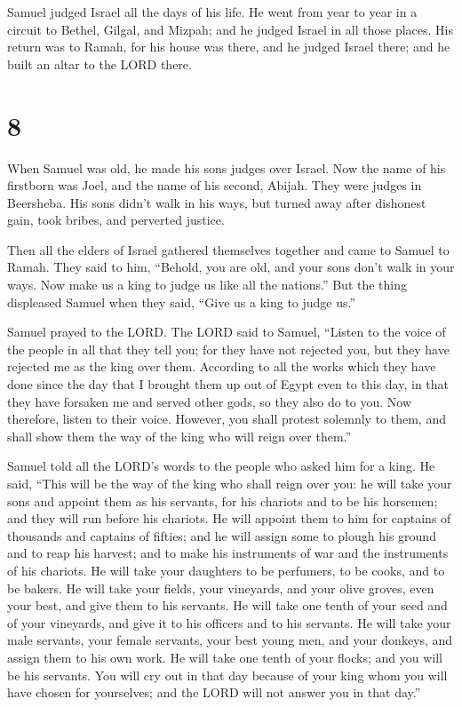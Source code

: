  Samuel judged Israel all the days of his life.
 He went from year to year in a circuit to Bethel,
Gilgal, and Mizpah; and he judged Israel in all those places.
 His return was to Ramah, for his house was there, and he
judged Israel there; and he built an altar to the LORD there.

\hypertarget{section-7}{%
\section{8}\label{section-7}}

 When Samuel was old, he made his sons judges over Israel.
 Now the name of his firstborn was Joel, and the name of
his second, Abijah. They were judges in Beersheba.  His
sons didn't walk in his ways, but turned away after dishonest gain, took
bribes, and perverted justice.

 Then all the elders of Israel gathered themselves
together and came to Samuel to Ramah.  They said to him,
``Behold, you are old, and your sons don't walk in your ways. Now make
us a king to judge us like all the nations.''  But the
thing displeased Samuel when they said, ``Give us a king to judge us.''

Samuel prayed to the LORD.  The LORD said to Samuel,
``Listen to the voice of the people in all that they tell you; for they
have not rejected you, but they have rejected me as the king over them.
 According to all the works which they have done since the
day that I brought them up out of Egypt even to this day, in that they
have forsaken me and served other gods, so they also do to you.
 Now therefore, listen to their voice. However, you shall
protest solemnly to them, and shall show them the way of the king who
will reign over them.''

 Samuel told all the LORD's words to the people who asked
him for a king.  He said, ``This will be the way of the
king who shall reign over you: he will take your sons and appoint them
as his servants, for his chariots and to be his horsemen; and they will
run before his chariots.  He will appoint them to him for
captains of thousands and captains of fifties; and he will assign some
to plough his ground and to reap his harvest; and to make his
instruments of war and the instruments of his chariots. 
He will take your daughters to be perfumers, to be cooks, and to be
bakers.  He will take your fields, your vineyards, and
your olive groves, even your best, and give them to his servants.
 He will take one tenth of your seed and of your
vineyards, and give it to his officers and to his servants.
 He will take your male servants, your female servants,
your best young men, and your donkeys, and assign them to his own work.
 He will take one tenth of your flocks; and you will be
his servants.  You will cry out in that day because of
your king whom you will have chosen for yourselves; and the LORD will
not answer you in that day.''

